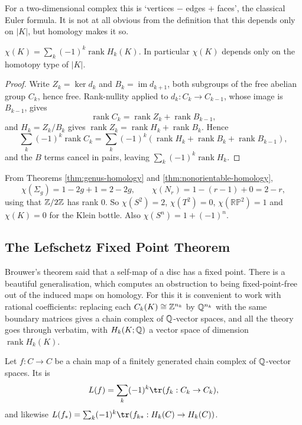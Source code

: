 \documentclass[a4paper]{scrartcl}
\newcommand{\RP}{\mathbb{RP}}
\begin{document}
For a two-dimensional complex this is `vertices $-$ edges $+$ faces', the classical Euler
formula. It is not at all obvious from the definition that this depends only on $|K|$,
but homology makes it so.

\begin{theorem} \label{at-thm:euler}
	$\displaystyle \chi(K) = \sum_k(-1)^k\operatorname{rank}H_k(K)$. In particular $\chi(K)$ depends only on the homotopy type of $|K|$.
\end{theorem}
\begin{proof}
	Write $Z_k = \ker d_k$ and $B_k = \operatorname{im}d_{k+1}$, both subgroups of the free abelian group $C_k$, hence free. Rank-nullity applied to $d_k: C_k \to C_{k-1}$, whose image is $B_{k-1}$, gives
	$$
	\operatorname{rank}C_k = \operatorname{rank}Z_k + \operatorname{rank}B_{k-1},
	$$
	and $H_k = Z_k/B_k$ gives $\operatorname{rank}Z_k = \operatorname{rank}H_k + \operatorname{rank}B_k$. Hence
	$$
	\sum_k(-1)^k\operatorname{rank}C_k = \sum_k(-1)^k(\operatorname{rank}H_k + \operatorname{rank}B_k + \operatorname{rank}B_{k-1}),
	$$
	and the $B$ terms cancel in pairs, leaving $\sum_k(-1)^k\operatorname{rank}H_k$.
\end{proof}

\begin{example}
	From Theorems \ref{thm:genus-homology} and \ref{thm:nonorientable-homology},
	$$
	\chi(\Sigma_g) = 1 - 2g + 1 = 2-2g, \qquad \chi(N_r) = 1 - (r-1) + 0 = 2 - r,
	$$
	using that $\mathbb{Z}/2\mathbb{Z}$ has rank $0$. So $\chi(S^2) = 2$, $\chi(T^2) = 0$, $\chi(\RP^2) = 1$ and $\chi(K) = 0$ for the Klein bottle. Also $\chi(S^n) = 1+(-1)^n$.
\end{example}

\subsection{The Lefschetz Fixed Point Theorem}

Brouwer's theorem said that a self-map of a disc has a fixed point. There is a beautiful
generalisation, which computes an obstruction to being fixed-point-free out of the
induced maps on homology. For this it is convenient to work with rational coefficients:
replacing each $C_k(K) \cong \mathbb{Z}^{n_k}$ by $\mathbb{Q}^{n_k}$ with the same boundary matrices gives
a chain complex of $\mathbb{Q}$-vector spaces, and all the theory goes through verbatim, with
$H_k(K;\mathbb{Q})$ a vector space of dimension $\operatorname{rank}H_k(K)$.

\begin{definition}
	Let $f: C \to C$ be a chain map of a finitely generated chain complex of $\mathbb{Q}$-vector spaces. Its  is
	$$
	L(f) = \sum_k (-1)^k \tr(f_k: C_k \to C_k),
	$$
	and likewise $L(f_*) = \sum_k(-1)^k\tr(f_{k*}: H_k(C)\to H_k(C))$.
\end{definition}
\end{document}
